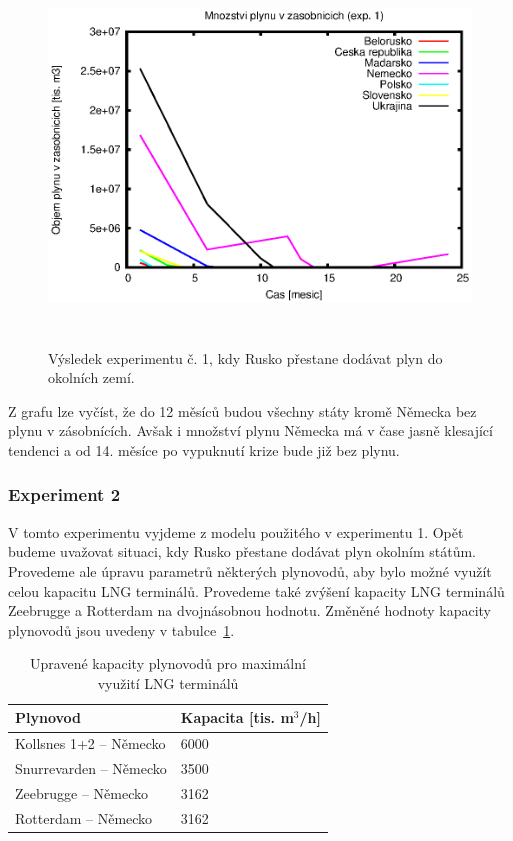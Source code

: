 \documentclass[a4paper,12pt]{article}
\begin{document}
  \begin{figure}[!ht]
    \centering
    \includegraphics[height=10cm]{img/0O.eps}
    \caption{Výsledek experimentu č. 1, kdy Rusko přestane dodávat plyn do okolních zemí.}
  \end{figure}
  
  Z grafu lze vyčíst, že do 12 měsíců budou všechny státy kromě Německa bez plynu v zásobnících.
  Avšak i množství plynu Německa má v čase jasně klesající tendenci a od 14. měsíce po 
  vypuknutí krize bude již bez plynu.
  
  \subsubsection{Experiment 2}
  V tomto experimentu vyjdeme z modelu použitého v experimentu 1. Opět budeme uvažovat situaci, 
  kdy Rusko přestane dodávat plyn okolním státům. Provedeme ale úpravu parametrů některých 
  plynovodů, aby bylo možné využít celou kapacitu LNG terminálů. Provedeme také zvýšení kapacity 
  LNG terminálů Zeebrugge a Rotterdam na dvojnásobnou hodnotu. Změněné hodnoty kapacity 
  plynovodů jsou uvedeny v tabulce~\ref{tabExp2}.
  
  \begin{table}[h!]
  \centering
  \begin{tabular}{| l | l |}
    \hline
    \textbf{Plynovod} & \textbf{Kapacita} [tis. m$^3$/h]  \\
    \hline\hline
    Kollsnes 1+2 -- Německo & 6000 \\ \hline
    Snurrevarden -- Německo & 3500 \\ \hline
    Zeebrugge -- Německo & 3162 \\ \hline
    Rotterdam -- Německo & 3162 \\ 
    \hline
  \end{tabular}
  \caption{Upravené kapacity plynovodů pro maximální využití LNG terminálů}
  \label{tabExp2}
  \end{table}
  
\end{document}

